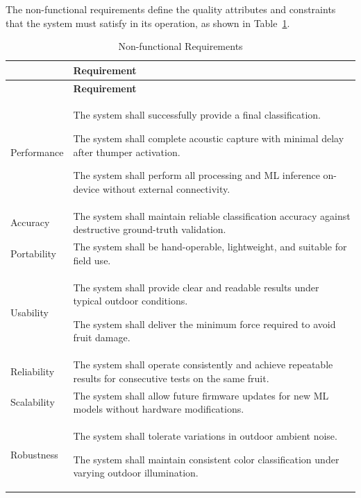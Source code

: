 \begin{thesisprose}
The non-functional requirements define the quality attributes and constraints that the system must satisfy in its operation, as shown in Table~\ref{tab:non-functional-requirements-384}.

\FloatBarrier
\begingroup
\small
\setlength{\tabcolsep}{3pt}
\renewcommand{\arraystretch}{1.14}
\setlength{\arrayrulewidth}{1pt}
\begin{longtable}{|>{\raggedright\arraybackslash}p{}|>{\raggedright\arraybackslash}p{}|}
\caption{Non-functional Requirements}\label{tab:non-functional-requirements-384}\\
\hline
{\bfseries \textbf{Category}} & {\bfseries \textbf{Requirement}} \\
\hline
\endfirsthead
\hline
{\bfseries \textbf{Category}} & {\bfseries \textbf{Requirement}} \\
\hline
\endhead
Performance & The system shall successfully provide a final classification.\par The system shall complete acoustic capture with minimal delay after thumper activation.\par The system shall perform all processing and ML inference on-device without external connectivity. \\
\hline
Accuracy & The system shall maintain reliable classification accuracy against destructive ground-truth validation. \\
\hline
Portability & The system shall be hand-operable, lightweight, and suitable for field use. \\
\hline
Usability & The system shall provide clear and readable results under typical outdoor conditions.\par The system shall deliver the minimum force required to avoid fruit damage. \\
\hline
Reliability & The system shall operate consistently and achieve repeatable results for consecutive tests on the same fruit. \\
\hline
Scalability & The system shall allow future firmware updates for new ML models without hardware modifications. \\
\hline
Robustness & The system shall tolerate variations in outdoor ambient noise.\par The system shall maintain consistent color classification under varying outdoor illumination. \\
\hline
\end{longtable}
\endgroup


\end{thesisprose}

